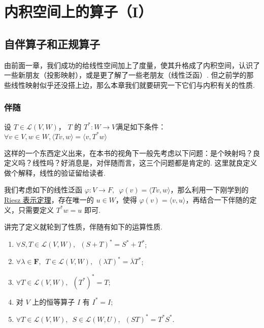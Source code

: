 \chapter{内积空间上的算子（I）}

\section{自伴算子和正规算子}

由前面一章，我们成功的给线性空间加上了度量，使其升格成了内积空间，认识了一些新朋友（投影映射），或是更了解了一些老朋友（线性泛函）. 但之前学的那些线性映射似乎还没搭上边，那么本章我们就要研究一下它们与内积有关的性质.

\subsection{伴随}

\begin{definition}[伴随] 
    设 $ T \in \mathcal{L}(V, W) $， $ T $ 的 $ T^*: W \rightarrow V $满足如下条件： $ \forall v \in V, w \in W, \langle Tv, w \rangle = \langle v, T^*w \rangle$
\end{definition}

这样的一个东西定义出来，在本书的视角下一般先考虑以下问题：是个映射吗？良定义吗？线性吗？好消息是，对伴随而言，这三个问题都是肯定的. 这里就良定义做个解释，线性的验证留给读者.

我们考虑如下的线性泛函 $ \varphi : V \rightarrow F, \enspace \varphi (v) = \langle Tv, w \rangle $，那么利用一下刚学到的 \hyperref[thm:23:Riesz]{Riesz 表示定理}，存在唯一的 $ u \in W $，使得 $ \varphi (v) = \langle v, u \rangle $，再结合一下伴随的定义，只需要定义 $ T^*w = u $ 即可.

讲完了定义就轮到了性质，伴随有如下的运算性质.
\begin{enumerate}
    \item $ \forall S, T \in \mathcal{L}(V, W),\enspace (S + T)^* = S^* + T^* $;

    \item $ \forall \lambda \in \mathbf{F},\enspace T \in \mathcal{L}(V, W),\enspace (\lambda T)^* = \overline{\lambda} T^* $;

    \item $ \forall T \in \mathcal{L}(V, W),\enspace (T^*)^* = T $;

    \item 对 $ V $ 上的恒等算子 $ I $ 有 $ I^* = I $;

    \item $ \forall T \in \mathcal{L}(V, W),\enspace S \in \mathcal{L}(W, U),\enspace (ST)^* = T^*S^* $.
\end{enumerate}

